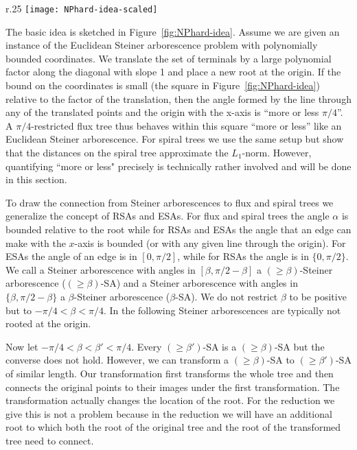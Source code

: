 \documentclass{journalA4}
\begin{document}
\begin{wrapfigure}[10]{r}{.25\textwidth}
  \centering
  \vspace{.35\baselineskip}
  \texttt{[image: NPhard-idea-scaled]}
  \vspace{-.35\baselineskip}
  \small{\caption{Reduction.\label{fig:NPhard-idea}}}
\end{wrapfigure}
The basic idea is sketched in Figure~\ref{fig:NPhard-idea}. Assume we are given an instance of the Euclidean Steiner arborescence problem with polynomially bounded coordinates. We translate the set of terminals by a large polynomial factor along the diagonal with slope 1 and place a new root at the origin. If the bound on the coordinates is small (the square in Figure~\ref{fig:NPhard-idea}) relative to the factor of the translation, then the angle formed by the line through any of the translated points and the origin with the x-axis is ``more or less $\pi/4$''. A $\pi/4$-restricted flux tree thus behaves within this square ``more or less'' like an Euclidean Steiner arborescence. For spiral trees we use the same setup but show that the distances on the spiral tree approximate the $L_1$-norm. However, quantifying ``more or less" precisely is technically rather involved and will be done in this section.

To draw the connection from Steiner arborescences to flux and spiral trees we generalize the concept of RSAs and ESAs. For flux and spiral trees the angle $\alpha$ is bounded relative to the root while for RSAs and ESAs the angle that an edge can make with the $x$-axis is bounded (or with any given line through the origin). For ESAs the angle of an edge is in $[0,\pi/2]$, while for RSAs the angle is in $\{0, \pi/2 \}$. We call a Steiner arborescence with angles in $[\beta,\pi/2-\beta]$ a $(\geq \beta)$-Steiner arborescence ($(\geq \beta)$-SA) and a Steiner arborescence with angles in $\{\beta,\pi/2-\beta\}$ a $\beta$-Steiner arborescence ($\beta$-SA). We do not restrict $\beta$ to be positive but to $-\pi/4 < \beta < \pi/4$. In the following Steiner arborescences are typically not rooted at the origin.

Now let $-\pi/4 < \beta < \beta' < \pi/4$. Every $(\geq \beta')$-SA is a $(\geq \beta)$-SA but the converse does not hold.
However, we can transform a $(\geq \beta)$-SA to $(\geq \beta')$-SA of similar length. Our transformation first transforms the whole tree and then connects the original points to their images under the first transformation. The transformation actually changes the location of the root. For the reduction we give this is not a problem because in the reduction we will have an additional root to which both the root of the original tree and the root of the transformed tree need to connect.
\end{document}
